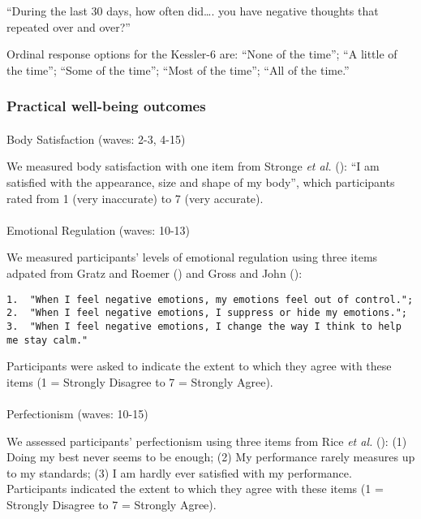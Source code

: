 \documentclass[
  singlecolumn,
  9pt]{scrartcl}
\makeatletter
\let\oldparagraph\paragraph
\renewcommand{\paragraph}{
    \@ifstar
      \xxxParagraphStar
      \xxxParagraphNoStar
  }
\newcommand{\xxxParagraphStar}[1]{\oldparagraph*{#1}\mbox{}}
\newcommand{\xxxParagraphNoStar}[1]{\oldparagraph{#1}\mbox{}}
\makeatother
\begin{document}
``During the last 30 days, how often did\ldots. you have negative
thoughts that repeated over and over?''

Ordinal response options for the Kessler-6 are: ``None of the time'';
``A little of the time''; ``Some of the time''; ``Most of the time'';
``All of the time.''

\subsubsection{Practical well-being
outcomes}\label{practical-well-being-outcomes}

\paragraph{Body Satisfaction (waves: 2-3,
4-15)}\label{body-satisfaction-waves-2-3-4-15}

We measured body satisfaction with one item from Stronge \emph{et al.}
(): ``I am satisfied with the
appearance, size and shape of my body'', which participants rated from 1
(very inaccurate) to 7 (very accurate).

\paragraph{Emotional Regulation (waves:
10-13)}\label{emotional-regulation-waves-10-13}

We measured participants' levels of emotional regulation using three
items adpated from Gratz and Roemer
() and Gross and John
():

\begin{verbatim}
1.  "When I feel negative emotions, my emotions feel out of control.";
2.  "When I feel negative emotions, I suppress or hide my emotions.";
3.  "When I feel negative emotions, I change the way I think to help me stay calm."
\end{verbatim}

Participants were asked to indicate the extent to which they agree with
these items (1 = Strongly Disagree to 7 = Strongly Agree).

\paragraph{Perfectionism (waves:
10-15)}\label{perfectionism-waves-10-15}

We assessed participants' perfectionism using three items from Rice
\emph{et al.} (): (1) Doing my best
never seems to be enough; (2) My performance rarely measures up to my
standards; (3) I am hardly ever satisfied with my performance.
Participants indicated the extent to which they agree with these items
(1 = Strongly Disagree to 7 = Strongly Agree).
\end{document}
